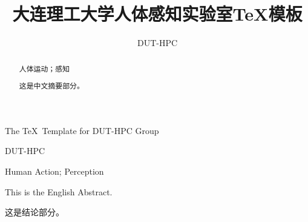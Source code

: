 \documentclass[master]{dutthesis} %
\begin{document}

\title{大连理工大学人体感知实验室\TeX 模板}{}{The \TeX\ Template for DUT-HPC Group}{}
%

\author{DUT-HPC}{DUT-HPC}
\maketitle

\begin{abstract}{人体运动；感知}

这是中文摘要部分。

\end{abstract}

\begin{englishabstract}{Human Action; Perception}

This is the English Abstract.
	
\end{englishabstract}

\let\cleardoublepage\clearpage

\tableofcontents %

\cleardoublepage


\stcleardp


\begin{Main} %




\begin{Conclusion}

这是结论部分。

\end{Conclusion}

\end{Main} %
\end{document}
